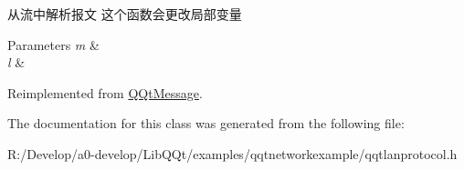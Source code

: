 从流中解析报文 这个函数会更改局部变量 


\begin{DoxyParams}{Parameters}
{\em m} & \\
\hline
{\em l} & \\
\hline
\end{DoxyParams}


Reimplemented from \mbox{\hyperlink{class_q_qt_message_a0bc25669bdd61490b1d8df6d77565f31}{Q\+Qt\+Message}}.



The documentation for this class was generated from the following file\+:\begin{DoxyCompactItemize}
\item 
R\+:/\+Develop/a0-\/develop/\+Lib\+Q\+Qt/examples/qqtnetworkexample/qqtlanprotocol.\+h\end{DoxyCompactItemize}
